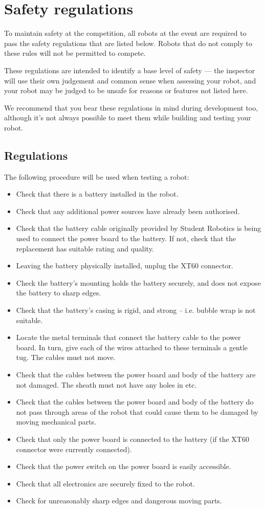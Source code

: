 \section {Safety regulations}
\label{sec:safety-regs}

To maintain safety at the competition, all robots at the event are required to
pass the safety regulations that are listed below. Robots that do not comply
to these rules will not be permitted to compete.

These regulations are intended to identify a base level of safety --- the
inspector will use their own judgement and common sense when assessing
your robot, and your robot may be judged to be unsafe for reasons or features
not listed here.

We recommend that you bear these regulations in mind during development too,
although it's not always possible to meet them while building and testing
your robot.

\subsection{Regulations}

The following procedure will be used when testing a robot:

\begin{itemize}
\item Check that there is a battery installed in the robot.
\item Check that any additional power sources have already been authorised.
\item Check that the battery cable originally provided by Student Robotics is being used to connect the power board to the battery. If not, check that the replacement has suitable rating and quality.
\item Leaving the battery physically installed, unplug the XT60 connector.
\item Check the battery's mounting holds the battery securely, and does not expose the battery to sharp edges.
\item Check that the battery's casing is rigid, and strong -- i.e. bubble wrap is not suitable.
\item Locate the metal terminals that connect the battery cable to the power board. In turn, give each of the wires attached to these terminals a gentle tug. The cables must not move.
\item Check that the cables between the power board and body of the battery are not damaged. The sheath must not have any holes in etc.
\item Check that the cables between the power board and body of the battery do not pass through areas of the robot that could cause them to be damaged by moving mechanical parts.
\item Check that only the power board is connected to the battery (if the XT60 connector were currently connected).
\item Check that the power switch on the power board is easily accessible.
\item Check that all electronics are securely fixed to the robot.
\item Check for unreasonably sharp edges and dangerous moving parts.
\end{itemize}
